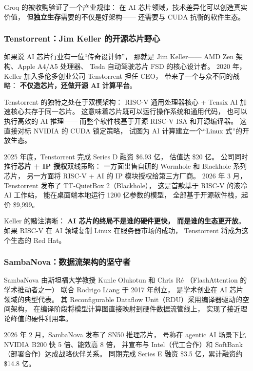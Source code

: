 Groq 的被收购验证了一个产业规律：
在 AI 芯片领域，技术差异化可以创造真实价值，
但\textbf{独立生存}需要的不仅是好架构——
还需要与 CUDA 抗衡的软件生态。

\subsubsection{Tenstorrent：Jim Keller 的开源芯片野心}

如果说 AI 芯片行业有一位``传奇设计师''，
那就是 Jim Keller——
AMD Zen 架构、Apple A4/A5 处理器、
Tesla 自动驾驶芯片 FSD 的核心设计者。
2020 年，Keller 加入多伦多创业公司 Tenstorrent 担任 CEO，
带来了一个与众不同的战略：
\textbf{不仅造芯片，还做开源 AI 计算平台}。

Tenstorrent 的独特之处在于双模架构：
RISC-V 通用处理器核心 + Tensix AI 加速核心共存于同一芯片。
这意味着芯片既可以运行操作系统和通用代码，
也可以执行高效的 AI 推理——
而整个软件栈基于开源 RISC-V ISA 和开源编译器。
这直接对标 NVIDIA 的 CUDA 锁定策略，
试图为 AI 计算建立一个``Linux 式''的开放生态。

2025 年底，Tenstorrent 完成 Series D 融资 \$6.93 亿，
估值达 \$20 亿。
公司同时推行\textbf{芯片 + IP 授权}双线策略：
一方面出售自研的 Wormhole 和 Blackhole 系列芯片，
另一方面将 RISC-V + AI 的 IP 模块授权给第三方厂商。
2026 年 3 月，Tenstorrent 发布了 TT-QuietBox 2（Blackhole），
这是首款基于 RISC-V 的液冷 AI 工作站，
能在桌面端本地运行 1200 亿参数的模型，
全部基于开源软件栈，起价 \$9,999。

Keller 的赌注清晰：
\textbf{AI 芯片的终局不是谁的硬件更快，
而是谁的生态更开放}。
如果 RISC-V 在 AI 领域复制 Linux 在服务器市场的成功，
Tenstorrent 将成为这个生态的 Red Hat。

\subsubsection{SambaNova：数据流架构的坚守者}

SambaNova 由斯坦福大学教授 Kunle Olukotun 和 Chris R\'{e}
（Flash\-Attention 的学术推动者之一）
联合 Rodrigo Liang 于 2017 年创立，
是学术创业在 AI 芯片领域的典型代表。
其 Reconfigurable Dataflow Unit（RDU）采用编译器驱动的空间架构，
在编译阶段将模型计算图直接映射到硬件数据流管线上，
实现了接近理论峰值的硬件利用率。

2026 年 2 月，SambaNova 发布了 SN50 推理芯片，
号称在 agentic AI 场景下比 NVIDIA B200 快 5 倍、能效高 8 倍，
并宣布与 Intel（代工合作）和 SoftBank（部署合作）达成战略伙伴关系。
同期完成 Series E 融资 \$3.5 亿，累计融资约 \$14.8 亿。

